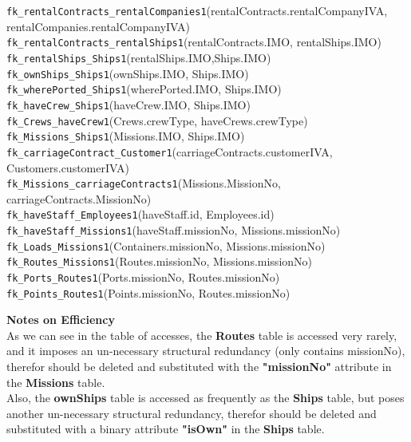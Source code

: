 \documentclass[10pt]{report}
\begin{document}
\begin{flushleft}
	\verb|fk_rentalContracts_rentalCompanies1|(rentalContracts.rentalCompanyIVA, rentalCompanies.rentalCompanyIVA)\\
	\verb|fk_rentalContracts_rentalShips1|(rentalContracts.IMO, rentalShips.IMO)\\
	\verb|fk_rentalShips_Ships1|(rentalShips.IMO,Ships.IMO)\\
	\verb|fk_ownShips_Ships1|(ownShips.IMO, Ships.IMO)\\
	\verb|fk_wherePorted_Ships1|(wherePorted.IMO, Ships.IMO)\\
	\verb|fk_haveCrew_Ships1|(haveCrew.IMO, Ships.IMO)\\
	\verb|fk_Crews_haveCrew1|(Crews.crewType, haveCrews.crewType)\\
	\verb|fk_Missions_Ships1|(Missions.IMO, Ships.IMO)\\
	\verb|fk_carriageContract_Customer1|(carriageContracts.customerIVA, Customers.customerIVA)\\
	\verb|fk_Missions_carriageContracts1|(Missions.MissionNo, carriageContracts.MissionNo)\\
	\verb|fk_haveStaff_Employees1|(haveStaff.id, Employees.id)\\
	\verb|fk_haveStaff_Missions1|(haveStaff.missionNo, Missions.missionNo)\\
	\verb|fk_Loads_Missions1|(Containers.missionNo, Missions.missionNo)\\
	\verb|fk_Routes_Missions1|(Routes.missionNo, Missions.missionNo)\\
	\verb|fk_Ports_Routes1|(Ports.missionNo, Routes.missionNo)\\
	\verb|fk_Points_Routes1|(Points.missionNo, Routes.missionNo)\\
\end{flushleft}
\textbf{Notes on Efficiency}\\
As we can see in the table of accesses, the \textbf{Routes} table is accessed very rarely, and it imposes an un-necessary structural redundancy (only contains missionNo), therefor should be deleted and substituted with the \textbf{"missionNo"} attribute in the \textbf{Missions} table.\\
Also, the \textbf{ownShips} table is accessed as frequently as the \textbf{Ships} table, but poses another un-necessary structural redundancy, therefor should be deleted and substituted with a binary attribute \textbf{"isOwn"} in the \textbf{Ships} table.
\newpage
\end{document}
